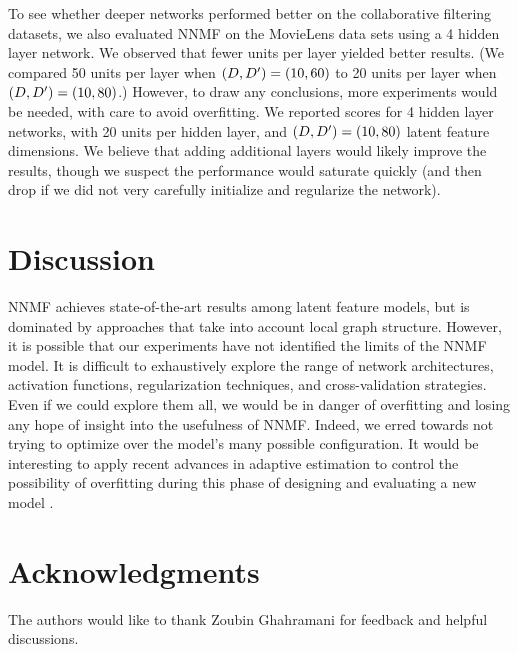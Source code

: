 \documentclass{article} \usepackage{iclr2016_conference,times}
\begin{document}
To see whether deeper networks performed better on the collaborative filtering datasets, we also evaluated NNMF on the MovieLens data sets using a 4 hidden layer network.  We observed that fewer units per layer yielded better results. (We compared 50 units per layer when $(D,{D'})=(10,60)$ to 20 units per layer when $(D,{D'}) = (10,80)$.) However, to draw any conclusions, more experiments would be needed, with care to avoid overfitting. We reported scores for 4 hidden layer networks, with 20 units per hidden layer, and $(D,{D'})=(10,80)$ latent feature dimensions.
We believe that adding additional layers would likely improve the results, though we suspect the performance would saturate quickly (and then drop if we did not very carefully initialize and regularize the network).


\section{Discussion}

NNMF achieves state-of-the-art results among latent feature models, but is dominated by approaches that take into account local graph structure.  However, it is possible that our experiments have not identified the limits of the NNMF model.  It is difficult to exhaustively explore the range of network architectures, activation functions, regularization techniques, and cross-validation strategies.  Even if we could explore them all, we would be in danger of overfitting and losing any hope of insight into the usefulness of NNMF.  Indeed, we erred towards not trying to optimize over the model's many possible configuration.  It would be interesting to apply recent advances in adaptive estimation to control the possibility of overfitting during this phase of designing and evaluating a new model \citep{Dwork07082015}.









\section*{Acknowledgments}

The authors would like to thank Zoubin Ghahramani for feedback and helpful discussions.










\vfill
\end{document}
